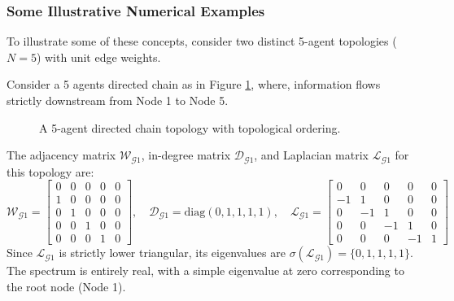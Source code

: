 \subsubsection{Some Illustrative Numerical Examples}
To illustrate some of these concepts, consider two distinct 5-agent topologies ($N = 5$) with unit edge weights.
\begin{example}\label{example:acyclic_chain_ex}
Consider a 5 agents directed chain as in Figure \ref{fig:acyclic_chain_ex}, where, information flows strictly downstream from Node 1 to Node 5.

\begin{figure}[ht!]
    \centering
    \caption{A 5-agent directed chain topology with topological ordering.}
    \label{fig:acyclic_chain_ex}
\end{figure}

The adjacency matrix $\mathcal{W}_{\mathcal{G}1}$, in-degree matrix $\mathcal{D}_{\mathcal{G}1}$, and Laplacian matrix $\mathcal{L}_{\mathcal{G}1}$ for this topology are:
\begin{equation*}
\mathcal{W}_{\mathcal{G}1} = \begin{bmatrix} 
0 & 0 & 0 & 0 & 0 \\ 
1 & 0 & 0 & 0 & 0 \\ 
0 & 1 & 0 & 0 & 0 \\ 
0 & 0 & 1 & 0 & 0 \\ 
0 & 0 & 0 & 1 & 0 
\end{bmatrix}, \quad
\mathcal{D}_{\mathcal{G}1} = \text{diag}(0, 1, 1, 1, 1), \quad
\mathcal{L}_{\mathcal{G}1} = \begin{bmatrix} 
0 & 0 & 0 & 0 & 0 \\ 
-1 & 1 & 0 & 0 & 0 \\ 
0 & -1 & 1 & 0 & 0 \\ 
0 & 0 & -1 & 1 & 0 \\ 
0 & 0 & 0 & -1 & 1 
\end{bmatrix}
\end{equation*}
Since $\mathcal{L}_{\mathcal{G}1}$ is strictly lower triangular, its eigenvalues are $\sigma(\mathcal{L}_{\mathcal{G}1}) = \{0, 1, 1, 1, 1\}$. The spectrum is entirely real, with a simple eigenvalue at zero corresponding to the root node (Node 1).
\end{example}

